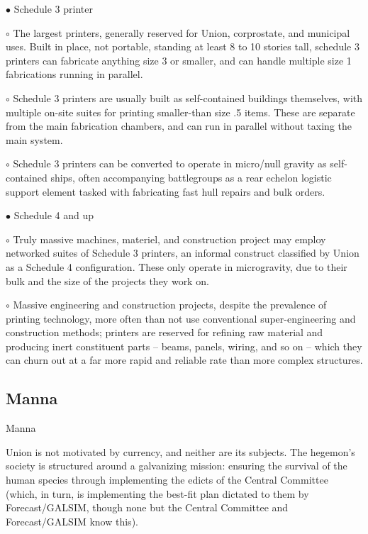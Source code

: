 $\bullet$    Schedule 3 printer

         $\circ$     The largest printers, generally reserved for Union, corprostate, and municipal
             uses. Built in place, not portable, standing at least 8 to 10 stories tall, schedule 3
             printers can fabricate anything size 3 or smaller, and can handle multiple size 1
             fabrications running in parallel.

         $\circ$     Schedule 3 printers are usually built as self-contained buildings themselves, with
             multiple on-site suites for printing smaller-than size .5 items. These are separate
             from the main fabrication chambers, and can run in parallel without taxing the
             main system.

         $\circ$     Schedule 3 printers can be converted to operate in micro/null gravity as self-
             contained ships, often accompanying battlegroups as a rear echelon logistic
             support element tasked with fabricating fast hull repairs and bulk orders.

$\bullet$    Schedule 4 and up

         $\circ$   Truly massive machines, materiel, and construction project may employ
             networked suites of Schedule 3 printers, an informal construct classified by Union
             as a Schedule 4 configuration. These only operate in microgravity, due to their
             bulk and the size of the projects they work on.

         $\circ$     Massive engineering and construction projects, despite the prevalence of printing
             technology, more often than not use conventional super-engineering and
             construction methods; printers are reserved for refining raw material and
             producing inert constituent parts -- beams, panels, wiring, and so on -- which they
             can churn out at a far more rapid and reliable rate than more complex structures.




\subsection{Manna}
Manna

Union is not motivated by currency, and neither are its subjects. The hegemon’s society is
structured around a galvanizing mission: ensuring the survival of the human species through
implementing the edicts of the Central Committee (which, in turn, is implementing the best-fit
plan dictated to them by Forecast/GALSIM, though none but the Central Committee and
Forecast/GALSIM know this).


